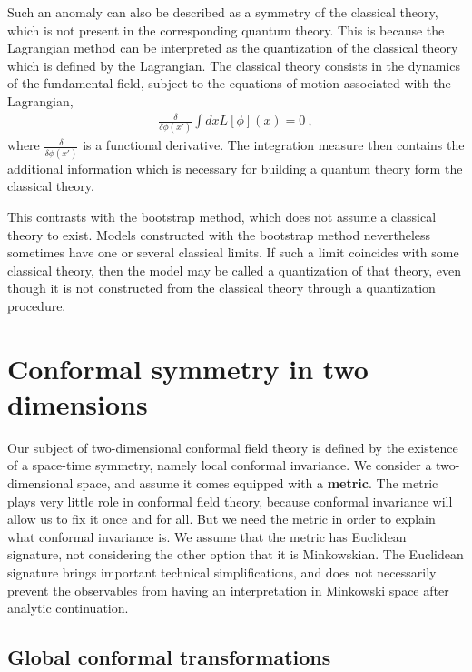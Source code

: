 \documentclass[12pt,a4paper,notitlepage]{report}
\numberwithin{equation}{section}
\newcommand{\term}[1]{\textbf{\boldmath #1}\index{#1}}
\theoremstyle{break}
\begin{document}
Such an anomaly can also be described as a symmetry of the classical theory, which is not present in the corresponding quantum theory.
This is because the Lagrangian method can be interpreted as the quantization of the classical theory which is defined by the Lagrangian.
The classical theory consists in the dynamics of the fundamental field, subject to the equations of motion associated with the Lagrangian, 
\begin{align}
 \frac{\delta }{\delta \phi(x')} \int dx L[\phi](x) = 0 \ ,
\end{align}
 where $\frac{\delta}{\delta\phi(x') } $ is a functional derivative.
The integration measure then contains the additional information which is necessary for building a quantum theory form the classical theory. 

This contrasts with the bootstrap method, which does not assume a classical theory to exist.
Models constructed with the bootstrap method nevertheless sometimes have one or several classical limits.
If such a limit coincides with some classical theory, then the model may be called a quantization of that theory, even though it is not constructed from the classical theory through a quantization procedure. 

\section{Conformal symmetry in two dimensions \label{secconf}}

Our subject of two-dimensional conformal field theory is defined by the existence of a space-time symmetry, namely local conformal invariance. 
We consider a two-dimensional space, and assume it comes equipped with a \term{metric}.
The metric plays very little role in conformal field theory, because conformal invariance will allow us to fix it once and for all.
But we need the metric in order to explain what conformal invariance is.
We assume that the metric has Euclidean signature, not considering the other option that it is Minkowskian.
The Euclidean signature brings important technical simplifications, and does not necessarily prevent the observables from having an interpretation in Minkowski space after analytic continuation.

\subsection{Global conformal transformations\label{secglob}}
\end{document}
